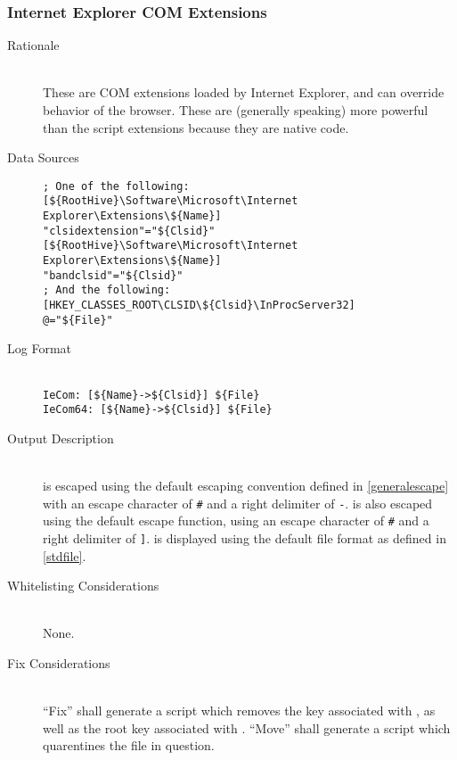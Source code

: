 \subsubsection{Internet Explorer COM Extensions}
\begin{description}
\item[Rationale] \hfill \\
These are COM extensions loaded by Internet Explorer, and can override
behavior of the browser. These are (generally speaking) more powerful than the
script extensions because they are native code.
\item[Data Sources] \hfill
\begin{verbatim}
; One of the following:
[${RootHive}\Software\Microsoft\Internet Explorer\Extensions\${Name}]
"clsidextension"="${Clsid}"
[${RootHive}\Software\Microsoft\Internet Explorer\Extensions\${Name}]
"bandclsid"="${Clsid}"
; And the following:
[HKEY_CLASSES_ROOT\CLSID\${Clsid}\InProcServer32]
@="${File}"
\end{verbatim}
\item[Log Format] \hfill \\
\verb|IeCom: [${Name}->${Clsid}] ${File}| \\
\verb|IeCom64: [${Name}->${Clsid}] ${File}|
\item[Output Description] \hfill \\
 is escaped using the default escaping convention defined in
\ref{generalescape} with an escape character of \verb|#| and a right delimiter
of \verb|-|.  is also escaped using the default escape function,
using an escape character of \verb|#| and a right delimiter of \verb|]|.
 is displayed using the default file format as defined in
\ref{stdfile}.
\item[Whitelisting Considerations] \hfill \\
None.
\item[Fix Considerations] \hfill \\
``Fix'' shall generate a script which removes the key associated with
, as well as the root key associated with .
``Move'' shall generate a script which quarentines the file in question.
\end{description}

